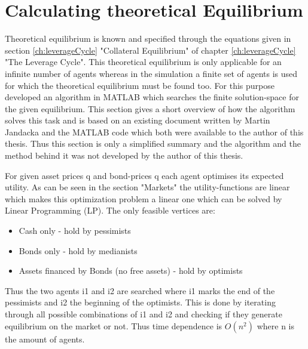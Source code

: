 \documentclass[Bachelorarbeit.tex]{subfiles}
\begin{document}
\section{Calculating theoretical Equilibrium}
Theoretical equilibrium is known and specified through the equations given in section \ref{ch:leverageCycle} "Collateral Equilibrium" of chapter \ref{ch:leverageCycle} "The Leverage Cycle". This theoretical equilibrium is only applicable for an infinite number of agents whereas in the simulation a finite set of agents is used for which the theoretical equilibrium must be found too. For this purpose \cite{Breuer2015} developed an algorithm in MATLAB which searches the finite solution-space for the given equilibrium. This section gives a short overview of how the algorithm solves this task and is based on an existing document written by Martin Jandacka and the MATLAB code which both were available to the author of this thesis. Thus this section is only a simplified summary and the algorithm and the method behind it was not developed by the author of this thesis.

\medskip

For given asset prices q and bond-prices q each agent optimises its expected utility. As can be seen in the section "Markets" the utility-functions are linear which makes this optimization problem a linear one which can be solved by Linear Programming (LP). The only feasible vertices are:

\begin{itemize}
\item Cash only - hold by pessimists
\item Bonds only - hold by medianists
\item Assets financed by Bonds (no free assets) - hold by optimists 
\end{itemize}

Thus the two agents i1 and i2 are searched where i1 marks the end of the pessimists and i2 the beginning of the optimists. This is done by iterating through all possible combinations of i1 and i2 and checking if they generate equilibrium on the market or not. Thus time dependence is $O(n^2)$ where n is the amount of agents. 
\end{document}
